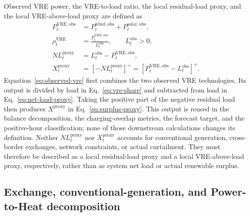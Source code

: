 \documentclass[11pt,a4paper]{article}
\begin{document}
Observed VRE power, the VRE-to-load ratio, the local residual-load proxy, and the local VRE-above-load proxy are defined as
\begin{align}
  P^{\mathrm{VRE,obs}}_t
  &=P^{\mathrm{wind,obs}}_t+P^{\mathrm{solar,obs}}_t,
  \label{eq:observed-vre}\\
  \rho^{\mathrm{VRE}}_t
  &=\frac{P^{\mathrm{VRE,obs}}_t}{L^{\mathrm{obs}}_t},
  \qquad L^{\mathrm{obs}}_t>0,
  \label{eq:vre-share}\\
  NL^{\mathrm{proxy}}_t
  &=L^{\mathrm{obs}}_t-P^{\mathrm{VRE,obs}}_t,
  \label{eq:net-load-proxy}\\
  X^{\mathrm{proxy}}_t
  &=\left[-NL^{\mathrm{proxy}}_t\right]^+
   =\left[P^{\mathrm{VRE,obs}}_t-L^{\mathrm{obs}}_t\right]^+.
  \label{eq:surplus-proxy}
\end{align}
Equation~\eqref{eq:observed-vre} first combines the two observed VRE
technologies.  Its output is divided by load in Eq.~\eqref{eq:vre-share} and
subtracted from load in Eq.~\eqref{eq:net-load-proxy}.  Taking the positive
part of the negative residual load then produces
$X^{\mathrm{proxy}}$ in Eq.~\eqref{eq:surplus-proxy}.  This output is reused in
the balance decomposition, the charging-overlap metrics, the forecast target,
and the positive-hour classification; none of those downstream calculations
changes its definition.
Neither $NL^{\mathrm{proxy}}_t$ nor $X^{\mathrm{proxy}}_t$ accounts for conventional generation, cross-border exchanges, network constraints, or actual curtailment. They must therefore be described as a local residual-load proxy and a local VRE-above-load proxy, respectively, rather than as system net load or actual renewable surplus.

\subsection{Exchange, conventional-generation, and Power-to-Heat decomposition}
\end{document}
